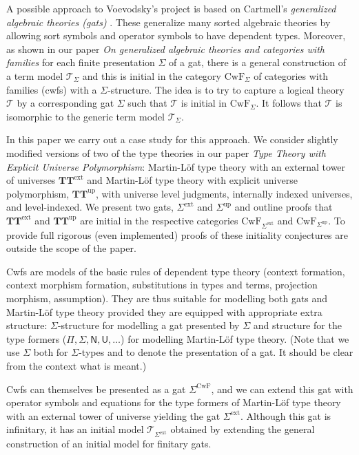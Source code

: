 \documentclass[11pt,a4paper]{article}
\theoremstyle{plain}
\theoremstyle{definition}
\newcommand{\UU}{\mathsf{U}}
\def\UU{\mathsf{U}}
\newcommand{\N}{\mathsf{N}}
\newcommand{\T}{\mathsf{T}}
\def\T{\mathcal{T}}
\def\CwF{\mathrm{CwF}}
\def\Sigmaext{{\Sigma^\mathrm{ext}}}
\def\Sigmaint{{\Sigma^\mathrm{up}}}
\def\TText{{\mathbf{TT}^\mathrm{ext}}}
\def\TTint{{\mathbf{TT}^\mathrm{up}}}
\begin{document}
A possible approach to Voevodsky's project is based on Cartmell's {\em generalized algebraic theories (gats)} \cite{cartmell:phd,cartmell:apal}. These generalize many sorted algebraic theories by allowing sort symbols and operator symbols to have dependent types. Moreover, as shown in our paper {\em On generalized algebraic theories and categories with families} \cite{bezem:hofmann} for each finite presentation $\Sigma$ of a gat, there is a general construction of a term model $\T_\Sigma$ and this is initial in the category $\CwF_\Sigma$ of categories with families (cwfs) \cite{dybjer:torino} with a $\Sigma$-structure. The idea is to try to capture a logical theory $\T$ by a corresponding gat $\Sigma$ such that $\T$  is initial in $\CwF_\Sigma$. It follows that $\T$ is isomorphic to the generic term model $\T_\Sigma$.

In this paper we carry out a case study for this approach. We consider slightly modified versions of two of the type theories in our paper {\em Type Theory with Explicit Universe Polymorphism}: Martin-Löf type theory with an external tower of universes $\TText$ and Martin-Löf type theory with explicit universe polymorphism, $\TTint$, with universe level judgments, internally indexed universes, and level-indexed. We present two gats, $\Sigmaext$ and $\Sigmaint$ and outline proofs that $\TText$ and $\TTint$ are initial in the respective categories $\CwF_\Sigmaext$ and $\CwF_\Sigmaint$. To provide full rigorous (even implemented) proofs of these initiality conjectures are outside the scope of the paper.

Cwfs are models of the basic rules of dependent type theory (context formation, context morphism formation, substitutions in types and terms, projection morphism, assumption). They are thus suitable for modelling both gats and Martin-Löf type theory provided they are equipped with appropriate extra structure: $\Sigma$-structure for modelling a gat presented by $\Sigma$ and structure for the type formers ($\Pi, \Sigma, \N, \UU, \ldots$) for modelling Martin-Löf type theory.  (Note that we use $\Sigma$ both for $\Sigma$-types and to denote the presentation of a gat. It should be clear from the context what is meant.)

Cwfs can themselves be presented as a gat $\Sigma^\CwF$, and we can extend this gat with operator symbols and equations for the type formers of Martin-Löf type theory with an external tower of universe yielding the gat $\Sigmaext$. Although this gat is infinitary, it has an initial model $\T_{\Sigmaext}$ obtained by extending the general construction of an initial model for finitary gats. 
\end{document}
